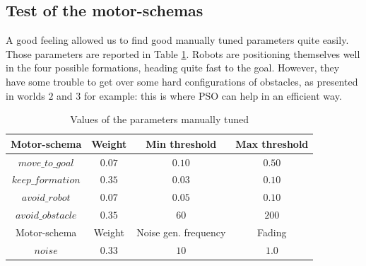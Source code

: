 \documentclass[journal]{IEEEtran}
\begin{document}
\subsection{Test of the motor-schemas}
A good feeling allowed us to find good manually tuned parameters quite easily. Those parameters are reported in Table \ref{manual_param}. Robots are positioning themselves well in the four possible formations, heading quite fast to the goal. However, they have some trouble to get over some hard configurations of obstacles, as presented in worlds $2$ and $3$ for example: this is where PSO can help in an efficient way. 
\begin{table}
\begin{center}
\begin{tabular}{|c|c|c|c|}
  \hline
  Motor-schema & Weight & Min threshold & Max threshold\\
  \hline
  $move\_to\_goal$ &  $0.07$ & $0.10$ & $0.50$\\
  $keep\_formation$ & $0.35$ & $0.03$ & $0.10$\\
  $avoid\_robot$ & $0.07$ & $0.05$ & $0.10$\\
  $avoid\_obstacle$ & $0.35$ & $60$ & $200$\\
  \hline
  Motor-schema & Weight & Noise gen. frequency & Fading \\
  \hline
  $noise$ & $0.33$ & $10$ & $1.0$\\
  \hline
\end{tabular}
\caption{Values of the parameters manually tuned} \label{manual_param}
\end{center} 
\end{table}
\end{document}
